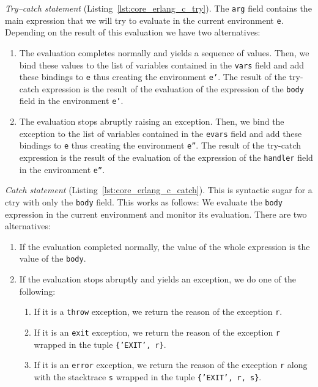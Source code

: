 \emph{Try–catch statement} (Listing~\ref{lst:core_erlang_c_try}).
The \texttt{arg} field contains the main expression that we will try to evaluate
in the current environment \texttt{e}. Depending on the result of this
evaluation we have two alternatives:

\begin{enumerate}
  \item The evaluation completes normally and yields a sequence of values.
    Then, we bind these values to the list of variables contained in the
    \texttt{vars} field and add these bindings to \texttt{e} thus creating the
    environment \texttt{e'}. The result of the try-catch expression is the result of the evaluation of the expression of the \texttt{body} field in the environment \texttt{e'}.
  \item The evaluation stops abruptly raising an exception. Then, we bind the
    exception to the list of variables contained in the \texttt{evars} field
    and add these bindings to \texttt{e} thus creating the environment
    \texttt{e''}. The result of the try-catch expression is the result of the evaluation of the expression of the \texttt{handler} field in the environment \texttt{e''}.
\end{enumerate}



\emph{Catch statement} (Listing~\ref{lst:core_erlang_c_catch}).
This is syntactic sugar for a c\textunderscore try with only the \texttt{body} field. This works as follows:
We evaluate the \texttt{body} expression in the current environment and monitor its evaluation. There are two alternatives:

\begin{enumerate}
  \item If the evaluation completed normally, the value of the whole expression is the value of the \texttt{body}.
  \item If the evaluation stops abruptly and yields an exception, we do one of the following:
    \begin{enumerate}
      \item If it is a \texttt{throw} exception, we return the reason of the
        exception \texttt{r}.
      \item If it is an \texttt{exit} exception, we return the reason of the
        exception \texttt{r} wrapped in the tuple \texttt{\{'EXIT', r\}}.
      \item If it is an \texttt{error} exception, we return the reason of the
        exception \texttt{r} along with the stacktrace \texttt{s} wrapped in
        the tuple \texttt{\{'EXIT', r, s\}}.
    \end{enumerate}
\end{enumerate}

